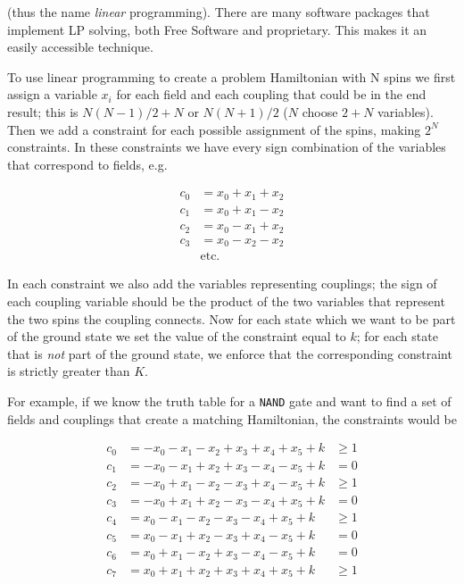 (thus the name \emph{linear} programming).  There are many software packages that implement LP solving, both Free Software and proprietary.  This makes it an easily accessible technique.

To use linear programming to create a problem Hamiltonian with N spins we first assign a variable $x_i$ for each field and each coupling that could be in the end result; this is $N(N-1)/2 + N$ or $N(N + 1)/2$ ($N$ choose $2 + N$ variables).  Then we add a constraint for each possible assignment of the spins, making $2^N$ constraints.  In these constraints we have every sign combination of the variables that correspond to fields, e.g.

\begin{align}
	 c_0 &  = x_0 + x_1 + x_2 \nonumber \\ 
	 c_1 & = x_0 + x_1 - x_2 \nonumber \\ 
	 c_2 & = x_0 - x_1 + x_2 \nonumber \\
	 c_3 & = x_0 - x_2 - x_2 \\
		 & \mathrm{etc.} \nonumber
\end{align}

In each constraint we also add the variables representing couplings; the sign of each coupling variable should be the product of the two variables that represent the two spins the coupling connects.  Now for each state which we want to be part of the ground state we set the value of the constraint equal to $k$; for each state that is \emph{not} part of the ground state, we enforce that the corresponding constraint is strictly greater than $K$.  

For example, if we know the truth table for a \texttt{NAND} gate and want to find a set of fields and couplings that create a matching Hamiltonian, the constraints would be

\begin{align}
	c_0 &= -x_0 - x_1 - x_2 + x_3 + x_4 + x_5 + k &\ge 1 \nonumber\\
	c_1 &= -x_0 - x_1 + x_2 + x_3 - x_4 - x_5 + k &= 0 \nonumber\\
	c_2 &= -x_0 + x_1 - x_2 - x_3 + x_4 - x_5 + k &\ge 1 \nonumber\\
	c_3 &= -x_0 + x_1 + x_2 - x_3 - x_4 + x_5 + k &= 0 \nonumber\\
	c_4 &= x_0 - x_1 - x_2 - x_3 - x_4 + x_5 + k &\ge 1 \nonumber\\
	c_5 &= x_0 - x_1 + x_2 - x_3 + x_4 - x_5 + k &= 0 \nonumber\\
	c_6 &= x_0 + x_1 - x_2 + x_3 - x_4 - x_5 + k &= 0 \nonumber\\
	c_7 &= x_0 + x_1 + x_2 + x_3 + x_4 + x_5 + k &\ge 1 
\end{align}

